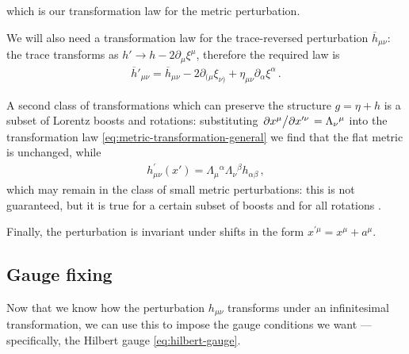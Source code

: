 \documentclass[main.tex]{subfiles}
\begin{document}
%
%
which is our transformation law for the metric perturbation. 

We will also need a transformation law for the trace-reversed perturbation \(\overline{h}_{\mu \nu }\): the trace transforms as \(h' \to h - 2 \partial_{\mu } \xi^{\mu }\), therefore the required law is 
%
\begin{align} \label{eq:perturbation-transformation-infinitesimal-tracereversed}
\overline{h}'_{\mu \nu } = \overline{h}_{\mu \nu } - 2 \partial_{(\mu } \xi_{\nu )} + \eta_{\mu \nu } \partial_{\alpha } \xi^{\alpha }
\,.
\end{align}


A second class of transformations which can preserve the structure \(g = \eta + h\) is a subset of Lorentz boosts and rotations: substituting \(\pdv*{x^{\mu }}{x^{\prime \nu }} = \Lambda_\nu{}^{\mu }\) into the transformation law \eqref{eq:metric-transformation-general} we find that the flat metric is unchanged, while 
%
\begin{align}
h^{\prime }_{\mu \nu } ( x') = \Lambda_{\mu }{}^{\alpha }
\Lambda_{\nu }{}^{\beta } h_{\alpha \beta }
\,,
\end{align}
%
which may remain in the class of small metric perturbations: this is not guaranteed, but it is true for a certain subset of boosts and for all rotations \cite{maggioreGravitationalWavesVolume2007}. 

Finally, the perturbation is invariant under shifts in the form \(x^{\prime \mu }= x^{\mu } + a^{\mu }\). 

\subsection{Gauge fixing} \label{sec:gauge-fixing}

Now that we know how the perturbation \(h_{\mu \nu }\) transforms under an infinitesimal transformation, we can use this to impose the gauge conditions we want --- specifically, the Hilbert gauge \eqref{eq:hilbert-gauge}.
\end{document}
